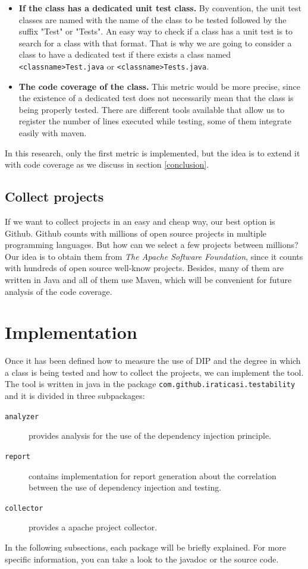 \documentclass[11pt, a4paper, twocolumn]{article}
\begin{document}
\begin{itemize}
\item \textbf{If the class has a dedicated unit test class.} By convention, the unit test classes are named with the name of the class to be tested followed by the suffix "Test" or "Tests". An easy way to check if a class has a unit test is to search for a class with that format. That is why we are going to consider a class to have a dedicated test if there exists a class named \verb+<classname>Test.java+ or \verb+<classname>Tests.java+.\\
\item \textbf{The code coverage of the class.} This metric would be more precise, since the existence of a dedicated test does not necessarily mean that the class is being properly tested. There are different tools available that allow us to register the number of lines executed while testing, some of them integrate easily with maven.
\end{itemize}
In this research, only the first metric is implemented, but the idea is to extend it with code coverage as we discuss in section \ref{conclusion}.\\

\subsection{Collect projects}
If we want to collect projects in an easy and cheap way, our best option is Github. Github counts with millions of open source projects in multiple programming languages. But how can we select a few projects between millions? Our idea is to obtain them from \textit{The Apache Software Foundation}, since it counts with hundreds of open source well-know projects. Besides, many of them are written in Java and all of them use Maven, which will be convenient for future analysis of the code coverage.\\



\section{Implementation}
Once it has been defined how to measure the use of DIP and the degree in which a class is being tested and how to collect the projects, we can implement the tool. The tool is written in java in the package \texttt{com.github.iraticasi.testability} and it is divided in three subpackages:
\begin{description}
\item[\texttt{analyzer}] provides analysis for the use of the dependency injection principle.
\item[\texttt{report}] contains implementation for report generation about the correlation between the use of dependency injection and testing.
\item[\texttt{collector}] provides a apache project collector.
\end{description}
In the following subsections, each package will be briefly explained. For more specific information, you can take a look to the javadoc or the source code.
\end{document}
